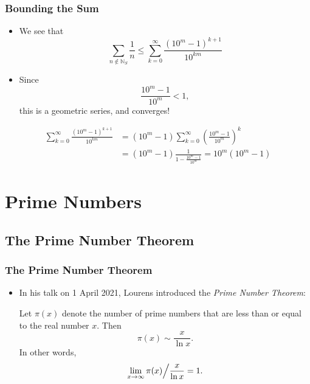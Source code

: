 \documentclass{beamer}
\begin{document}
\begin{frame}
    \frametitle{Bounding the Sum}

    \begin{itemize}
        \item We see that
        \[
            \sum_{n \not\in \mathbb{N}_S} \frac{1}{n} \leq \sum_{k = 0}^{\infty} \frac{\left( 10^m - 1 \right)^{k + 1}}{10^{km}}
        \]
        \pause
        \item Since
        \[
            \frac{10^m - 1}{10^m} < 1,
        \]
        this is a geometric series, and converges!
    \end{itemize}
    \pause
    \begin{align*}
        \sum_{k = 0}^{\infty} \frac{\left( 10^m - 1 \right)^{k + 1}}{10^{km}} & = \left( 10^m - 1 \right) \sum_{k = 0}^{\infty} \left( \frac{10^m - 1}{10^m} \right)^k \\
        & = \left( 10^m - 1 \right) \frac{1}{1 - \frac{10^m - 1}{10^m}} = 10^m \left( 10^m - 1 \right)
    \end{align*}

\end{frame}

\section{Prime Numbers}
\subsection{The Prime Number Theorem}

\begin{frame}
    \frametitle{The Prime Number Theorem}

    \begin{itemize}
        \item In his talk on 1 April 2021, Lourens introduced the \emph{Prime Number Theorem}:
        \begin{theorem}
            Let $\pi(x)$ denote the number of prime numbers that are less than or equal to the real number $x$. Then
            \[
                \pi(x) \sim \frac{x}{\ln x}.
            \]
            In other words,
            \[
                \lim_{x \to \infty} \pi(x) \Big\slash \frac{x}{\ln x} = 1.
            \]
        \end{theorem}
    \end{itemize}

\end{frame}
\end{document}
